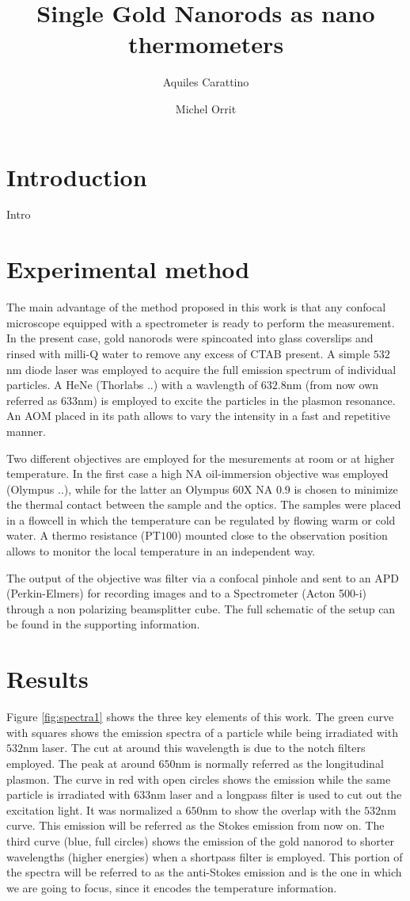 \documentclass[twocolumn]{article}
\title{Single Gold Nanorods as nano thermometers}
\author{Aquiles Carattino \and Michel Orrit}
\begin{document}
\maketitle
{}

\section{Introduction}
Intro
\section{Experimental method}
The main advantage of the method proposed in this work is that any confocal
microscope equipped with a spectrometer is ready to perform the measurement. In
the present case, gold nanorods were spincoated into glass coverslips and rinsed
with milli-Q water to remove any excess of CTAB present. A simple $532$nm diode
laser was employed to acquire the full emission spectrum of individual
particles. A HeNe (Thorlabs ..) with a wavlength of $632.8$nm (from now own
referred as $633$nm) is employed to excite the particles in the plasmon
resonance.
An AOM placed in its path allows to vary the intensity in a fast and repetitive
manner.

Two different objectives are employed for the mesurements at room or at higher
temperature. In the first case a high NA oil-immersion
objective was employed (Olympus ..), while for the latter an Olympus 60X NA 0.9 is chosen to minimize
the thermal contact between the sample and the optics. The samples were placed
in a flowcell in which the temperature can be regulated by flowing warm or cold
water. A thermo resistance (PT$100$) mounted close to the observation position
allows to monitor the local temperature in an independent way. 

The output of the objective was filter via a confocal pinhole and sent to an APD
(Perkin-Elmers) for recording images and to a Spectrometer (Acton 500-i) through
a non polarizing beamsplitter cube. The full schematic of the setup can be found
in the supporting information.

\section{Results}
Figure \ref{fig:spectra1} shows the three key elements of this work. The green
curve with squares shows the emission spectra of a particle while being
irradiated with $532$nm laser. The cut at around this wavelength is due to the
notch filters employed. The peak at around $650$nm is normally referred as the
longitudinal plasmon. The curve in red with open circles shows the emission
while the same particle is irradiated with $633$nm laser and a longpass filter
is used to cut out the excitation light. It was normalized a $650$nm to show the
overlap with the $532$nm curve. This emission will be referred as the Stokes
emission from now on. The third curve (blue, full circles) shows the emission of
the gold nanorod to shorter wavelengths (higher energies) when a shortpass
filter is employed. This portion of the spectra will be referred to as the
anti-Stokes emission and is the one in which we are going to focus, since it
encodes the temperature information. 
\end{document}
